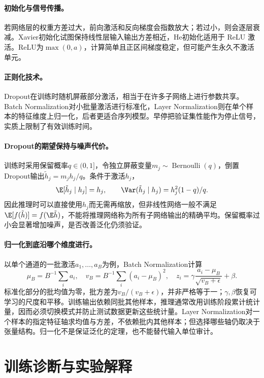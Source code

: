 \paragraph{初始化与信号传播。}
若网络层的权重方差过大，前向激活和反向梯度会指数放大；若过小，则会逐层衰减。Xavier初始化试图保持线性层输入输出方差相近，He初始化适用于 ReLU 激活。ReLU为$\max(0,a)$，计算简单且正区间梯度稳定，但可能产生永久不激活单元。

\paragraph{正则化技术。}
Dropout在训练时随机屏蔽部分激活，相当于在许多子网络上进行参数共享。Batch Normalization对小批量激活进行标准化，Layer Normalization则在单个样本的特征维度上归一化，后者更适合序列模型。早停把验证集性能作为停止信号，实质上限制了有效训练时间。

\paragraph{Dropout的期望保持与噪声代价。}
训练时采用保留概率$q\in(0,1]$，令独立屏蔽变量$m_j\sim\operatorname{Bernoulli}(q)$，倒置Dropout输出$\tilde h_j=m_jh_j/q$。条件于激活$h_j$，
\begin{equation}
 \E[\tilde h_j\mid h_j]=h_j,\qquad
 \Var(\tilde h_j\mid h_j)=h_j^2(1-q)/q.
\end{equation}
因此推理时可以直接使用$h_j$而无需再缩放，但非线性网络一般不满足$\E[f(\tilde h)]=f(\E\tilde h)$，不能将推理网络称为所有子网络输出的精确平均。保留概率过小会显著增加噪声，是否改善泛化仍须验证。

\paragraph{归一化到底沿哪个维度进行。}
以单个通道的一批激活$a_1,\ldots,a_B$为例，Batch Normalization计算
\begin{equation}
 \mu_B=B^{-1}\sum_i a_i,\quad
 v_B=B^{-1}\sum_i(a_i-\mu_B)^2,\quad
 z_i=\gamma\frac{a_i-\mu_B}{\sqrt{v_B+\epsilon}}+\beta.
\end{equation}
标准化部分的批均值为零，批方差为$v_B/(v_B+\epsilon)$，并非严格等于一；$\gamma,\beta$恢复可学习的尺度和平移。训练输出依赖同批其他样本，推理通常改用训练阶段累计统计量，因而必须切换模式并防止测试数据更新这些统计量。Layer Normalization对一个样本的指定特征轴求均值与方差，不依赖批内其他样本；但选择哪些轴仍取决于张量结构。归一化不是保证泛化的定理，也不能替代输入单位审计。

\section{训练诊断与实验解释}

